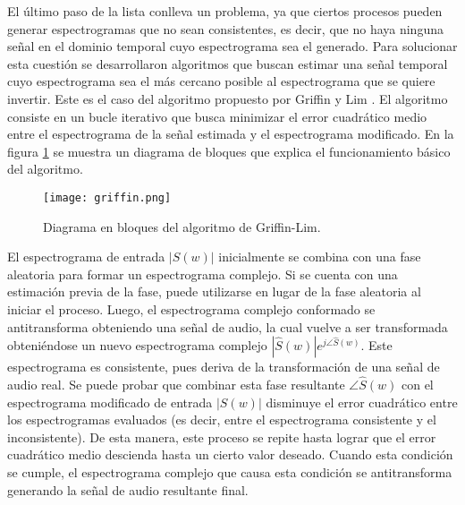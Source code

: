 El último paso de la lista conlleva un problema, ya que ciertos procesos pueden generar espectrogramas que no sean consistentes, es decir, que no haya ninguna señal en el dominio temporal cuyo espectrograma sea el generado. Para solucionar esta cuestión se desarrollaron algoritmos que buscan estimar una señal temporal cuyo espectrograma sea el más cercano posible al espectrograma que se quiere invertir. Este es el caso del algoritmo propuesto por Griffin y Lim \cite{griffinlim}. El algoritmo consiste en un bucle iterativo que busca minimizar el error cuadrático medio entre el espectrograma de la señal estimada y el espectrograma modificado. En la figura \ref{fig:griffin} se muestra un diagrama de bloques que explica el funcionamiento básico del algoritmo. 

\begin{figure}[H]
  \centering{}
  \texttt{[image: griffin.png]}
  \caption{Diagrama en bloques del algoritmo de Griffin-Lim.}
  \label{fig:griffin}
\end{figure}

El espectrograma de entrada $\left | S(w) \right |$ inicialmente se combina con una fase aleatoria para formar un espectrograma complejo. Si se cuenta con una estimación previa de la fase, puede utilizarse en lugar de la fase aleatoria al iniciar el proceso. Luego, el espectrograma complejo conformado se antitransforma obteniendo una señal de audio, la cual vuelve a ser transformada obteniéndose un nuevo espectrograma complejo $\left | \hat{S}(w) \right |e^{j\angle \hat{S}(w)}$. Este espectrograma es consistente, pues deriva de la transformación de una señal de audio real. Se puede probar que combinar esta fase resultante $\angle \hat{S}(w)$ con el espectrograma modificado de entrada $\left | S(w) \right |$ disminuye el error cuadrático entre los espectrogramas evaluados (es decir, entre el espectrograma consistente y el inconsistente). De esta manera, este proceso se repite hasta lograr que el error cuadrático medio descienda hasta un cierto valor deseado. Cuando esta condición se cumple, el espectrograma complejo que causa esta condición se antitransforma generando la señal de audio resultante final. 

